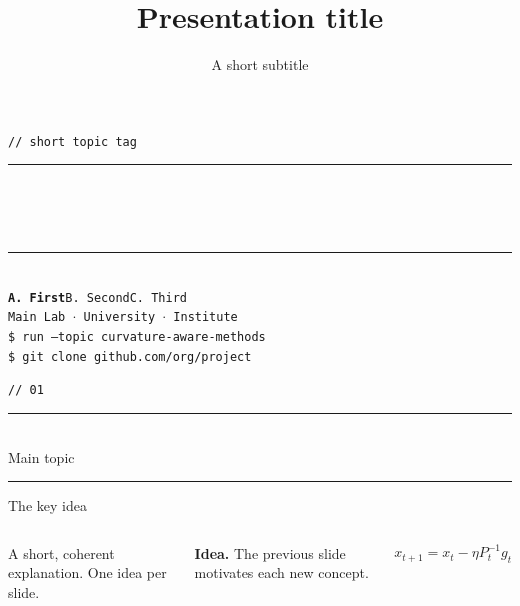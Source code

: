 \documentclass[aspectratio=169,10pt]{beamer}
\title{Presentation title}
\subtitle{A short subtitle}
\newcommand{\topicframe}[2]{%
  \begin{frame}[plain]
    \vfill
    \begin{center}
      {\color{accent}\texttt{\small // #1}}\\[0.25cm]
      {\color{border}\rule{0.72\textwidth}{0.4pt}}\\[0.4cm]
      {\color{accent}\Huge\ttfamily #2}\\[0.35cm]
      {\color{border}\rule{0.42\textwidth}{0.3pt}}
    \end{center}
    \vfill
  \end{frame}}
\begin{document}
\begin{frame}[plain]
  \vfill
  \begin{center}
    {\color{accent}\texttt{\small // short topic tag}}\\[0.22cm]
    {\color{border}\rule{0.82\textwidth}{0.4pt}}\\[0.30cm]
    {\color{accent}\inserttitle}\\[0.14cm]
    {\color{accentblue}\large\insertsubtitle}\\[0.34cm]
    {\color{border}\rule{0.55\textwidth}{0.3pt}}\\[0.22cm]
    {\texttt{\small{\color{accentorange}\textbf{A.\,First}}{\color{textsub}\quad B.\,Second\quad C.\,Third}}}\\[0.12cm]
    {\texttt{\small{\color{accentorange}Main Lab}{\color{textsub}\ $\cdot$\ University\ $\cdot$\ Institute}}}\\[0.32cm]
    {\color{accent}\texttt{\small \$ run --topic curvature-aware-methods}}\\[0.16cm]
    {\color{accentblue}\texttt{\small \$ git clone github.com/org/project}}
  \end{center}
  \vfill
\end{frame}

\topicframe{01}{Main topic}

\begin{frame}{The key idea}
\begin{columns}[T]
A short, coherent explanation. One idea per slide.
\begin{tcolorbox}[ideabox]
{\color{accent}\bfseries Idea.} The previous slide motivates each new concept.
\end{tcolorbox}
\begin{tcolorbox}[mathbox]
$$x_{t+1}=x_t-\eta P_t^{-1}g_t$$
\end{tcolorbox}
\end{columns}
\end{frame}

\end{document}

